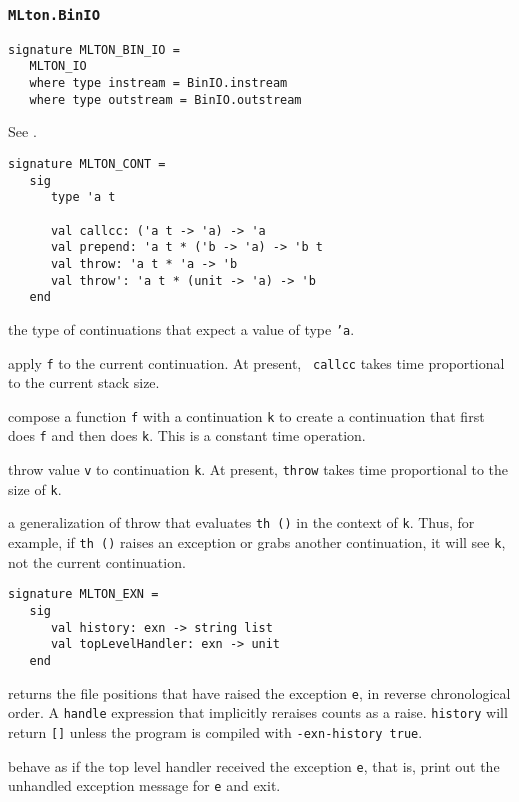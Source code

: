 \subsubsection{{\tt MLton.BinIO}}

\begin{verbatim}
signature MLTON_BIN_IO =
   MLTON_IO
   where type instream = BinIO.instream
   where type outstream = BinIO.outstream
\end{verbatim}

See .


\begin{verbatim}
signature MLTON_CONT =
   sig
      type 'a t

      val callcc: ('a t -> 'a) -> 'a
      val prepend: 'a t * ('b -> 'a) -> 'b t
      val throw: 'a t * 'a -> 'b
      val throw': 'a t * (unit -> 'a) -> 'b
   end
\end{verbatim}

\begin{description}

the type of continuations that expect a value of type {\tt 'a}.

apply {\tt f} to the current continuation.  At present, {\tt
callcc} takes time proportional to the current stack size.

compose a function {\tt f} with a continuation {\tt k} to create a
continuation that first does {\tt f} and then does {\tt k}.  This
is a constant time operation.

throw value {\tt v} to continuation {\tt k}.  At present, {\tt throw}
takes time proportional to the size of {\tt k}.

a generalization of throw that evaluates {\tt th ()} in the context
of {\tt k}.  Thus, for example, if {\tt th ()} raises an exception or
grabs another continuation, it will see {\tt k}, not the current
continuation.

\end{description}

\begin{verbatim}
signature MLTON_EXN =
   sig
      val history: exn -> string list
      val topLevelHandler: exn -> unit
   end
\end{verbatim}

\begin{description}

returns the file positions that have raised the exception {\tt e}, in reverse
chronological order.   A {\tt handle} expression that implicitly reraises counts
as a raise.  {\tt history} will return {\tt []} unless the program is compiled
with {\tt -exn-history true}.

behave as if the top level handler received the exception {\tt e},
that is, print out the unhandled exception message for {\tt e} and
exit.

\end{description}

